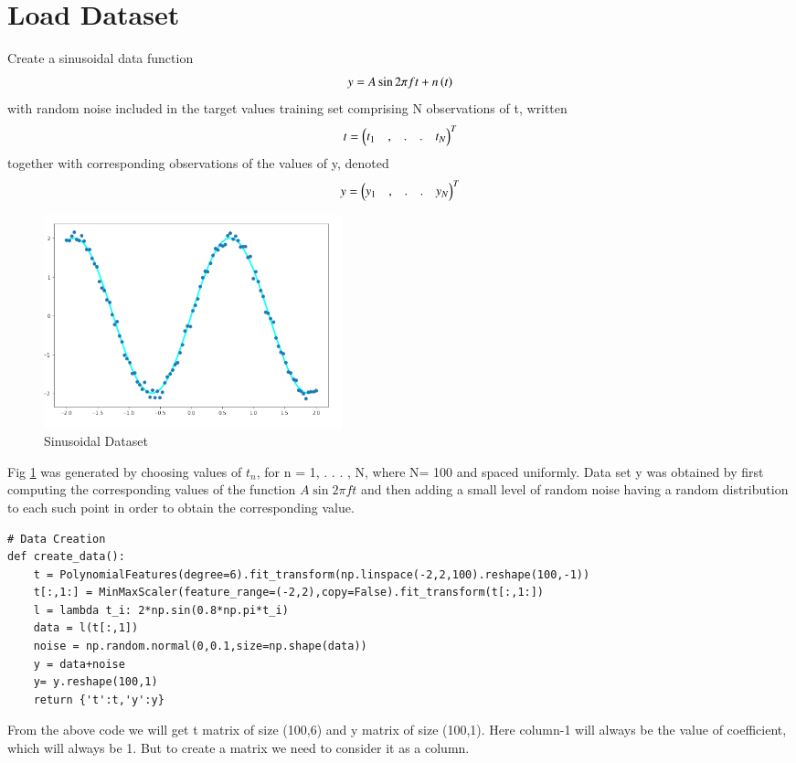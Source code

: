 \documentclass[journal,12pt,twocolumn]{IEEEtran}
\begin{document}
\section{Load Dataset}
Create a sinusoidal data function
\begin{align}
    y = A\sin{2\pi{ft}}+n\left(t\right)
\end{align}
with random noise included in the target values training set comprising N observations of t,
written
\begin{align}
    t=\begin{pmatrix}t_1 &,&.&.& t_N\end{pmatrix}^T 
\end{align}
together with corresponding observations of the values
of y, denoted 
\begin{align}
    y=\begin{pmatrix}y_1 &,&.&.& y_N\end{pmatrix}^T
\end{align}
\begin{figure}[!h]
\begin{center}
\includegraphics[width=3.4in]{a1.png}
\end{center}
\caption{Sinusoidal Dataset}
\label{fig:1}
\end{figure}
Fig \ref{fig:1} was generated by choosing
values of $t_n$, for n = 1, . . . , N, where N= 100 and spaced uniformly. Data set y was obtained by first computing the corresponding values of the function $A\sin2\pi{ft}$ and then adding a small level of random noise having a random distribution to each such point in order to obtain the corresponding value.
\begin{lstlisting}
# Data Creation
def create_data():
    t = PolynomialFeatures(degree=6).fit_transform(np.linspace(-2,2,100).reshape(100,-1))
    t[:,1:] = MinMaxScaler(feature_range=(-2,2),copy=False).fit_transform(t[:,1:])
    l = lambda t_i: 2*np.sin(0.8*np.pi*t_i)
    data = l(t[:,1])
    noise = np.random.normal(0,0.1,size=np.shape(data))
    y = data+noise
    y= y.reshape(100,1)
    return {'t':t,'y':y}
\end{lstlisting}
From the above code we will get t matrix of size (100,6) and y matrix of size (100,1). Here column-1 will always be the value of coefficient, which will always be 1. But to create a matrix we need to consider it as a column.
\end{document}
